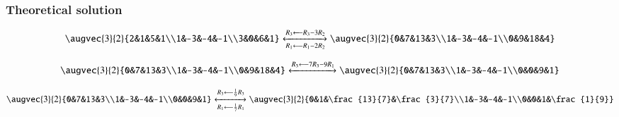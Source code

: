 \documentclass{beamer}
\begin{document}
    \begin{frame}
    \frametitle{Theoretical solution}
\begin{align}
  \augvec{3}{2}{2&1&5&1\\1&-3&-4&-1\\3&0&6&1}\xleftrightarrow[R_1\longleftarrow R_1-2R_2]{R_3\longleftarrow R_3-3R_2}\augvec{3}{2}{0&7&13&3\\1&-3&-4&-1\\0&9&18&4}
\end{align}

\begin{align}
\augvec{3}{2}{0&7&13&3\\1&-3&-4&-1\\0&9&18&4}\xleftrightarrow{R_3\longleftarrow 7R_3-9R_1}\augvec{3}{2}{0&7&13&3\\1&-3&-4&-1\\0&0&9&1}
\end{align}

\begin{align}
\augvec{3}{2}{0&7&13&3\\1&-3&-4&-1\\0&0&9&1}\xleftrightarrow[R_1\longleftarrow \frac{1}{7}R_1]{R_3\longleftarrow \frac{1}{9}R_3} \augvec{3}{2}{0&1&\frac{13}{7}&\frac{3}{7}\\1&-3&-4&-1\\0&0&1&\frac{1}{9}}
\end{align}








    \end{frame}
\end{document}
